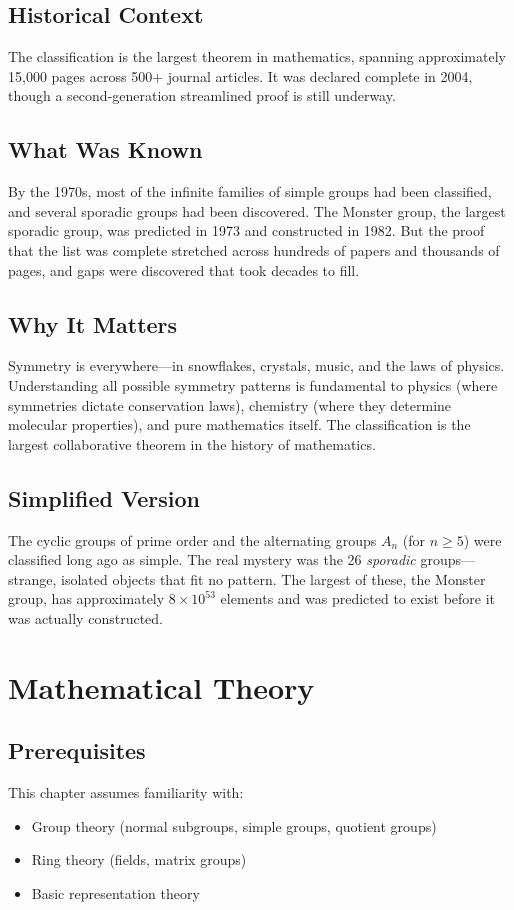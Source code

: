 \subsection{Historical Context}
The classification is the largest theorem in mathematics, spanning approximately 15,000 pages across 500+ journal articles. It was declared complete in 2004, though a second-generation streamlined proof is still underway.

\subsection{What Was Known}
By the 1970s, most of the infinite families of simple groups had been classified, and several sporadic groups had been discovered. The Monster group, the largest sporadic group, was predicted in 1973 and constructed in 1982. But the proof that the list was complete stretched across hundreds of papers and thousands of pages, and gaps were discovered that took decades to fill.

\subsection{Why It Matters}
Symmetry is everywhere---in snowflakes, crystals, music, and the laws of physics. Understanding all possible symmetry patterns is fundamental to physics (where symmetries dictate conservation laws), chemistry (where they determine molecular properties), and pure mathematics itself. The classification is the largest collaborative theorem in the history of mathematics.

\subsection{Simplified Version}
The cyclic groups of prime order and the alternating groups $A_n$ (for $n \ge 5$) were classified long ago as simple. The real mystery was the 26 \emph{sporadic} groups---strange, isolated objects that fit no pattern. The largest of these, the Monster group, has approximately $8 \times 10^{53}$ elements and was predicted to exist before it was actually constructed.

\section{Mathematical Theory}


\subsection{Prerequisites}
This chapter assumes familiarity with:
\begin{itemize}
\item Group theory (normal subgroups, simple groups, quotient groups)
\item Ring theory (fields, matrix groups)
\item Basic representation theory
\end{itemize}

